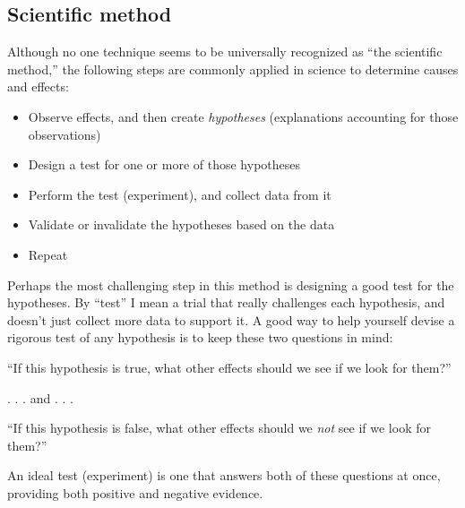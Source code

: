 





\filbreak
\subsection{Scientific method}

Although no one technique seems to be universally recognized as ``the scientific method,'' the following steps are commonly applied in science to determine causes and effects:

\begin{itemize}
\item Observe effects, and then create \textit{hypotheses} (explanations accounting for those observations)
\item Design a test for one or more of those hypotheses
\item Perform the test (experiment), and collect data from it
\item Validate or invalidate the hypotheses based on the data
\item Repeat
\end{itemize}

Perhaps the most challenging step in this method is designing a good test for the hypotheses.  By ``test'' I mean a trial that really challenges each hypothesis, and doesn't just collect more data to support it.  A good way to help yourself devise a rigorous test of any hypothesis is to keep these two questions in mind:

\vskip 10pt {\narrower \noindent \baselineskip5pt

``If this hypothesis is true, what other effects should we see if we look for them?''

\par} \vskip 10pt

\centerline{. . . and . . .}

\vskip 10pt {\narrower \noindent \baselineskip5pt

``If this hypothesis is false, what other effects should we \textit{not} see if we look for them?''

\par} \vskip 10pt

An ideal test (experiment) is one that answers both of these questions at once, providing both positive and negative evidence.

